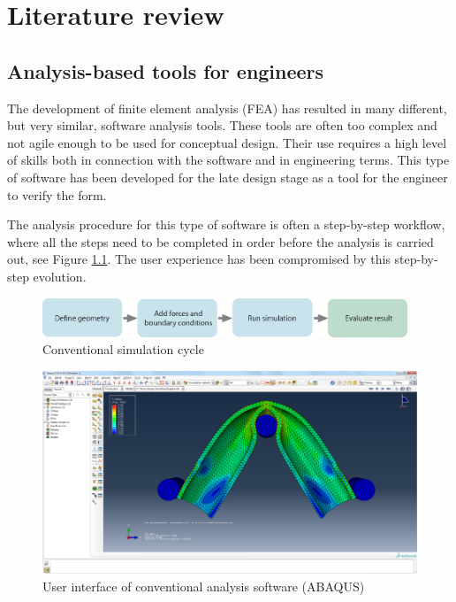 \chapter{Literature review}
\label{ch:Literature review}
\section{Analysis-based tools for engineers}
The development of finite element analysis (FEA) has resulted in many different, but very similar, software analysis tools. These tools are often too complex and not agile enough to be used for conceptual design. Their use requires a high level of skills both in connection with the software and in engineering terms. This type of software has been developed for the late design stage as a tool for the engineer to verify the form. 

 The analysis procedure for this type of software is often a step-by-step workflow, where all the steps need to be completed in order before the analysis is carried out, see Figure \ref{fig:conventional-cycle}. The user experience has been compromised by this step-by-step evolution.

\begin{figure}
  \includegraphics[width=310pt]{graphics/conventional-cycle.eps}
  \caption{Conventional simulation cycle}
  \label{fig:conventional-cycle}
\end{figure}

\begin{figure}
  \includegraphics[width=350pt]{graphics/abaqus.png}
  \caption{User interface of conventional analysis software (ABAQUS)}
  \label{fig:abaqus}
\end{figure}

